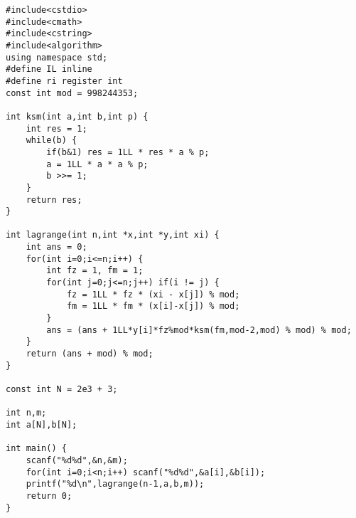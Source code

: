 \documentclass[UTF8]{ctexart}
\begin{document}
\begin{framed}
\begin{lstlisting}
#include<cstdio>
#include<cmath>
#include<cstring>
#include<algorithm>
using namespace std;
#define IL inline
#define ri register int 
const int mod = 998244353;

int ksm(int a,int b,int p) {
    int res = 1;
    while(b) {
        if(b&1) res = 1LL * res * a % p;
        a = 1LL * a * a % p;
        b >>= 1;
    }
    return res;
}

int lagrange(int n,int *x,int *y,int xi) {
    int ans = 0;
    for(int i=0;i<=n;i++) {
        int fz = 1, fm = 1;
        for(int j=0;j<=n;j++) if(i != j) {
            fz = 1LL * fz * (xi - x[j]) % mod;
            fm = 1LL * fm * (x[i]-x[j]) % mod;
        }
        ans = (ans + 1LL*y[i]*fz%mod*ksm(fm,mod-2,mod) % mod) % mod;
    }
    return (ans + mod) % mod;
}

const int N = 2e3 + 3;

int n,m;
int a[N],b[N];

int main() {
    scanf("%d%d",&n,&m);
    for(int i=0;i<n;i++) scanf("%d%d",&a[i],&b[i]);
    printf("%d\n",lagrange(n-1,a,b,m));
    return 0;
}
\end{lstlisting}
\end{framed}
\end{document}
